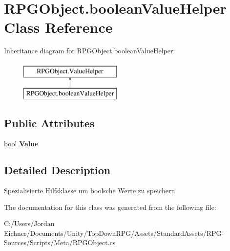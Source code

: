 \hypertarget{class_r_p_g_object_1_1boolean_value_helper}{}\section{R\+P\+G\+Object.\+boolean\+Value\+Helper Class Reference}
\label{class_r_p_g_object_1_1boolean_value_helper}
Inheritance diagram for R\+P\+G\+Object.\+boolean\+Value\+Helper\+:\begin{figure}[H]
\begin{center}
\leavevmode
\includegraphics[height=2.000000cm]{class_r_p_g_object_1_1boolean_value_helper}
\end{center}
\end{figure}
\subsection*{Public Attributes}
\begin{DoxyCompactItemize}
\item 
\hypertarget{class_r_p_g_object_1_1boolean_value_helper_af964a85c583322a703930e4d6c0ba270}{}bool {\bfseries Value}\label{class_r_p_g_object_1_1boolean_value_helper_af964a85c583322a703930e4d6c0ba270}

\end{DoxyCompactItemize}


\subsection{Detailed Description}
Spezialisierte Hilfsklasse um boolsche Werte zu speichern 

The documentation for this class was generated from the following file\+:\begin{DoxyCompactItemize}
\item 
C\+:/\+Users/\+Jordan Eichner/\+Documents/\+Unity/\+Top\+Down\+R\+P\+G/\+Assets/\+Standard\+Assets/\+R\+P\+G-\/\+Sources/\+Scripts/\+Meta/R\+P\+G\+Object.\+cs\end{DoxyCompactItemize}
